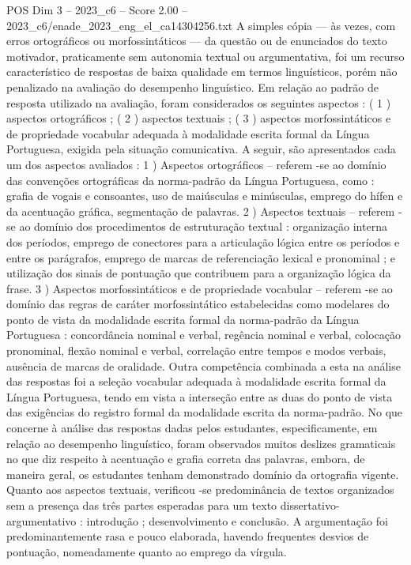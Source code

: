 \begin{textsample}{POS Dim 3 – 2023\_c6 – Score 2.00 – 2023\_c6/enade\_2023\_eng\_el\_ca14304256.txt}
A simples cópia — às vezes, com erros ortográficos ou morfossintáticos — da questão ou de enunciados do texto motivador, praticamente sem autonomia textual ou argumentativa, foi um recurso característico de respostas de baixa qualidade em termos linguísticos, porém não penalizado na avaliação do desempenho linguístico.
Em relação ao padrão de resposta utilizado na avaliação, foram considerados os seguintes aspectos : ( 1 ) aspectos ortográficos ; ( 2 ) aspectos textuais ; ( 3 ) aspectos morfossintáticos e de propriedade vocabular adequada à modalidade escrita formal da Língua Portuguesa, exigida pela situação comunicativa.
A seguir, são apresentados cada um dos aspectos avaliados : 1 ) Aspectos ortográficos – referem -se ao domínio das convenções ortográficas da norma-padrão da Língua Portuguesa, como : grafia de vogais e consoantes, uso de maiúsculas e minúsculas, emprego do hífen e da acentuação gráfica, segmentação de palavras. 2 ) Aspectos textuais – referem -se ao domínio dos procedimentos de estruturação textual : organização interna dos períodos, emprego de conectores para a articulação lógica entre os períodos e entre os parágrafos, emprego de marcas de referenciação lexical e pronominal ; e utilização dos sinais de pontuação que contribuem para a organização lógica da frase. 3 ) Aspectos morfossintáticos e de propriedade vocabular – referem -se ao domínio das regras de caráter morfossintático estabelecidas como modelares do ponto de vista da modalidade escrita formal da norma-padrão da Língua Portuguesa : concordância nominal e verbal, regência nominal e verbal, colocação pronominal, flexão nominal e verbal, correlação entre tempos e modos verbais, ausência de marcas de oralidade.
Outra competência combinada a esta na análise das respostas foi a seleção vocabular adequada à modalidade escrita formal da Língua Portuguesa, tendo em vista a interseção entre as duas do ponto de vista das exigências do registro formal da modalidade escrita da norma-padrão.
No que concerne à análise das respostas dadas pelos estudantes, especificamente, em relação ao desempenho linguístico, foram observados muitos deslizes gramaticais no que diz respeito à acentuação e grafia correta das palavras, embora, de maneira geral, os estudantes tenham demonstrado domínio da ortografia vigente.
Quanto aos aspectos textuais, verificou -se predominância de textos organizados sem a presença das três partes esperadas para um texto dissertativo-argumentativo : introdução ; desenvolvimento e conclusão.
A argumentação foi predominantemente rasa e pouco elaborada, havendo frequentes desvios de pontuação, nomeadamente quanto ao emprego da vírgula.

\end{textsample}
